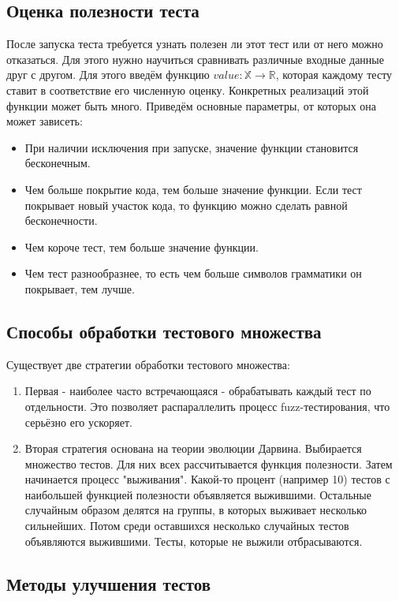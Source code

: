 \documentclass[a4paper]{article}
\begin{document}
\subsection{Оценка полезности теста}
\indent

После запуска теста требуется узнать полезен ли этот тест или от него можно отказаться. Для этого нужно научиться сравнивать различные входные данные друг с другом.
Для этого введём функцию $value : \mathbb {X} \rightarrow \mathbb {R}$, которая каждому тесту ставит в соответствие его численную оценку. Конкретных реализаций этой функции может быть много. Приведём основные параметры, от которых она может зависеть:
\begin{itemize}
    \item При наличии исключения при запуске, значение функции становится бесконечным.
    \item Чем больше покрытие кода, тем больше значение функции. Если тест покрывает новый участок кода, то функцию можно сделать равной бесконечности.
    \item Чем короче тест, тем больше значение функции.
    \item Чем тест разнообразнее, то есть чем больше символов грамматики он покрывает, тем лучше.
\end{itemize}

\subsection{Способы обработки тестового множества}
\indent

Существует две стратегии обработки тестового множества:

\begin{enumerate}
\item Первая - наиболее часто встречающаяся - обрабатывать каждый тест по отдельности. Это позволяет распараллелить процесс fuzz-тестирования, что серьёзно его ускоряет. 
\item Вторая стратегия основана на теории эволюции Дарвина. Выбирается множество тестов. Для них всех рассчитывается функция полезности. Затем начинается процесс "выживания". Какой-то процент (например 10) тестов с наибольшей функцией полезности объявляется выжившими. Остальные случайным образом делятся на группы, в которых выживает несколько сильнейших. Потом среди оставшихся несколько случайных тестов объявляются выжившими. Тесты, которые не выжили отбрасываются.
\end{enumerate}

\subsection{Методы улучшения тестов}
\indent
\end{document}
